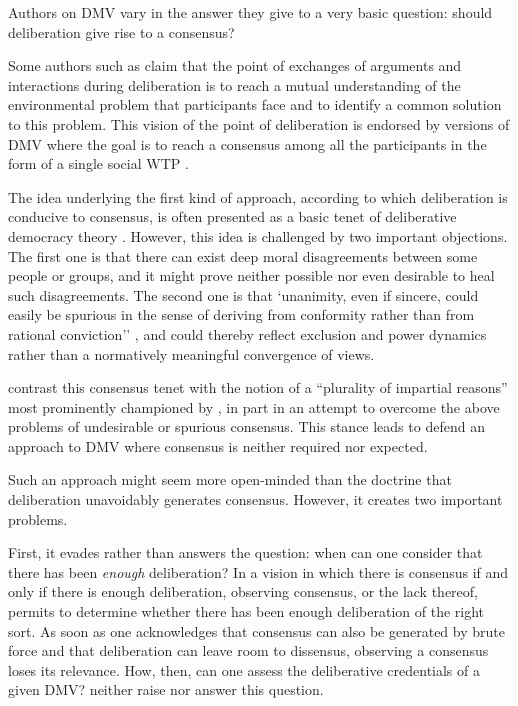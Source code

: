 \documentclass[version=3.21, pagesize, twoside=off, bibliography=totoc, DIV=calc, fontsize=12pt, a4paper, french, english]{scrartcl}
\begin{document}
Authors on DMV vary in the answer they give to a very basic question: should deliberation give rise to a consensus?

Some authors such as \citet{vatn_institutional_2009} claim that the point of exchanges of arguments and interactions during deliberation is to reach a mutual understanding of the environmental problem that participants face and to identify a common solution to this problem. 
This vision of the point of deliberation is endorsed by versions of DMV where the goal is to reach a consensus among all the participants in the form of a single social WTP \citep{orchard-webb_deliberative_2016}.


The idea underlying the first kind of approach, according to which deliberation is conducive to consensus, is often presented as a basic tenet of deliberative democracy theory \citep{wilson_discourse-based_2002}. 
However, this idea is challenged by two important objections.
The first one is that there can exist deep moral disagreements \citep{dryzek_deliberative_2013} between some people or groups, and it might prove neither possible nor even desirable to heal such disagreements.
The second one is that `unanimity, even if sincere, could easily be spurious in the sense of deriving from conformity rather than from rational conviction'' \citep{elster_sour_1983}, and could thereby reflect exclusion and power dynamics \citep{volker_exploring_2016,vargas_background_2016,vargas_problem_2017} rather than a normatively meaningful convergence of views.

\citeauthor{bartkowski_beyond_2018} contrast this consensus tenet with the notion of a ``plurality of impartial reasons'' most prominently championed by \citet{sen_idea_2009}, in part in an attempt to overcome the above problems of undesirable or spurious consensus.
This stance leads \citeauthor{bartkowski_beyond_2018} to defend an approach to DMV where consensus is neither required nor expected. 

Such an approach might seem more open-minded than the doctrine that deliberation unavoidably generates consensus. However, it creates two important problems.

First, it evades rather than answers the question: when can one consider that there has been \emph{enough} deliberation? 
In a vision in which there is consensus if and only if there is enough deliberation, observing consensus, or the lack thereof, permits to determine whether there has been enough deliberation of the right sort. 
As soon as one acknowledges that consensus can also be generated by brute force and that deliberation can leave room to dissensus, observing a consensus loses its relevance. 
How, then, can one assess the deliberative credentials of a given DMV? 
\citeauthor{bartkowski_beyond_2018} neither raise nor answer this question.
\end{document}
